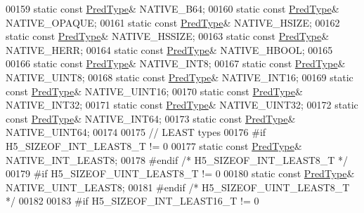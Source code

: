 \begin{DoxyCode}
00159         \textcolor{keyword}{static} \textcolor{keyword}{const} \hyperlink{class_h5_1_1_pred_type}{PredType}& NATIVE\_B64;
00160         \textcolor{keyword}{static} \textcolor{keyword}{const} \hyperlink{class_h5_1_1_pred_type}{PredType}& NATIVE\_OPAQUE;
00161         \textcolor{keyword}{static} \textcolor{keyword}{const} \hyperlink{class_h5_1_1_pred_type}{PredType}& NATIVE\_HSIZE;
00162         \textcolor{keyword}{static} \textcolor{keyword}{const} \hyperlink{class_h5_1_1_pred_type}{PredType}& NATIVE\_HSSIZE;
00163         \textcolor{keyword}{static} \textcolor{keyword}{const} \hyperlink{class_h5_1_1_pred_type}{PredType}& NATIVE\_HERR;
00164         \textcolor{keyword}{static} \textcolor{keyword}{const} \hyperlink{class_h5_1_1_pred_type}{PredType}& NATIVE\_HBOOL;
00165 
00166         \textcolor{keyword}{static} \textcolor{keyword}{const} \hyperlink{class_h5_1_1_pred_type}{PredType}& NATIVE\_INT8;
00167         \textcolor{keyword}{static} \textcolor{keyword}{const} \hyperlink{class_h5_1_1_pred_type}{PredType}& NATIVE\_UINT8;
00168         \textcolor{keyword}{static} \textcolor{keyword}{const} \hyperlink{class_h5_1_1_pred_type}{PredType}& NATIVE\_INT16;
00169         \textcolor{keyword}{static} \textcolor{keyword}{const} \hyperlink{class_h5_1_1_pred_type}{PredType}& NATIVE\_UINT16;
00170         \textcolor{keyword}{static} \textcolor{keyword}{const} \hyperlink{class_h5_1_1_pred_type}{PredType}& NATIVE\_INT32;
00171         \textcolor{keyword}{static} \textcolor{keyword}{const} \hyperlink{class_h5_1_1_pred_type}{PredType}& NATIVE\_UINT32;
00172         \textcolor{keyword}{static} \textcolor{keyword}{const} \hyperlink{class_h5_1_1_pred_type}{PredType}& NATIVE\_INT64;
00173         \textcolor{keyword}{static} \textcolor{keyword}{const} \hyperlink{class_h5_1_1_pred_type}{PredType}& NATIVE\_UINT64;
00174 
00175 \textcolor{comment}{// LEAST types}
00176 \textcolor{preprocessor}{#if H5\_SIZEOF\_INT\_LEAST8\_T != 0}
00177         \textcolor{keyword}{static} \textcolor{keyword}{const} \hyperlink{class_h5_1_1_pred_type}{PredType}& NATIVE\_INT\_LEAST8;
00178 \textcolor{preprocessor}{#endif }\textcolor{comment}{/* H5\_SIZEOF\_INT\_LEAST8\_T */}\textcolor{preprocessor}{}
00179 \textcolor{preprocessor}{#if H5\_SIZEOF\_UINT\_LEAST8\_T != 0}
00180         \textcolor{keyword}{static} \textcolor{keyword}{const} \hyperlink{class_h5_1_1_pred_type}{PredType}& NATIVE\_UINT\_LEAST8;
00181 \textcolor{preprocessor}{#endif }\textcolor{comment}{/* H5\_SIZEOF\_UINT\_LEAST8\_T */}\textcolor{preprocessor}{}
00182 
00183 \textcolor{preprocessor}{#if H5\_SIZEOF\_INT\_LEAST16\_T != 0}

\end{DoxyCode}
